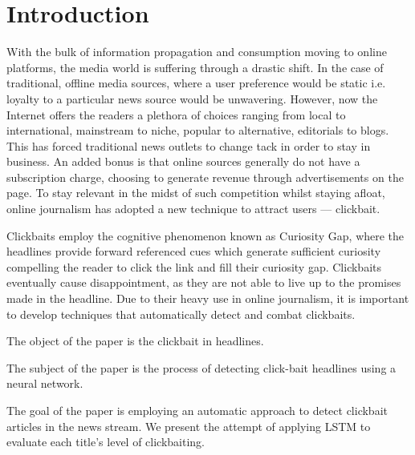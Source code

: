 \section{Introduction}
With the bulk of information propagation and consumption moving to online platforms, the media world is suffering through a drastic shift. 
In the case of traditional, offline media sources, where a user preference would be static i.e. loyalty to a particular news source would be unwavering. However, now the Internet offers the readers a plethora of choices ranging from local to international, mainstream to niche, popular to alternative, editorials to blogs. 
This has forced traditional news outlets to change tack in order to stay in business. 
An added bonus is that online sources generally do not have a subscription charge, choosing to generate revenue through advertisements on the page. To stay relevant in the midst of such competition whilst staying afloat, online journalism has adopted a new technique to attract users --- clickbait.

Clickbaits employ the cognitive phenomenon known as Curiosity Gap, where the headlines provide forward referenced cues which generate sufficient curiosity compelling the reader to click the link and fill their curiosity gap. 
Clickbaits eventually cause disappointment, as they are not able to live up to the promises made in the headline. 
Due to their heavy use in online journalism, it is important to develop techniques that automatically detect and combat clickbaits.

The object of the paper is the clickbait in headlines.

The subject of the paper is the process of detecting click-bait headlines using a neural network. 

The goal of the paper is employing an automatic approach to detect clickbait articles in the news stream. We present the attempt of applying LSTM to evaluate each title's level of clickbaiting.
